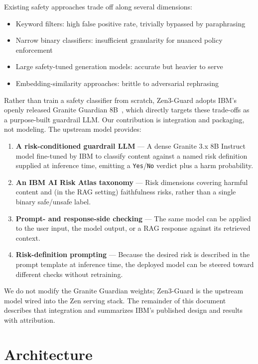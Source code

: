 \documentclass[11pt,a4paper]{article}
\begin{document}
Existing safety approaches trade off along several dimensions:
\begin{itemize}
\item Keyword filters: high false positive rate, trivially bypassed by paraphrasing
\item Narrow binary classifiers: insufficient granularity for nuanced policy enforcement
\item Large safety-tuned generation models: accurate but heavier to serve
\item Embedding-similarity approaches: brittle to adversarial rephrasing
\end{itemize}

Rather than train a safety classifier from scratch, Zen3-Guard adopts IBM's openly
released Granite Guardian 8B~\cite{graniteguardian}, which directly targets these
trade-offs as a purpose-built guardrail LLM. Our contribution is integration and
packaging, not modeling. The upstream model provides:

\begin{enumerate}
\item \textbf{A risk-conditioned guardrail LLM} --- A dense Granite 3.x 8B Instruct model
      fine-tuned by IBM to classify content against a named risk definition supplied at
      inference time, emitting a \texttt{Yes}/\texttt{No} verdict plus a harm probability.
\item \textbf{An IBM AI Risk Atlas taxonomy} --- Risk dimensions covering harmful content
      and (in the RAG setting) faithfulness risks, rather than a single binary safe/unsafe
      label.
\item \textbf{Prompt- and response-side checking} --- The same model can be applied to the
      user input, the model output, or a RAG response against its retrieved context.
\item \textbf{Risk-definition prompting} --- Because the desired risk is described in the
      prompt template at inference time, the deployed model can be steered toward different
      checks without retraining.
\end{enumerate}

We do not modify the Granite Guardian weights; Zen3-Guard is the upstream model wired into
the Zen serving stack. The remainder of this document describes that integration and
summarizes IBM's published design and results with attribution.

\section{Architecture}
\label{sec:arch}
\end{document}
